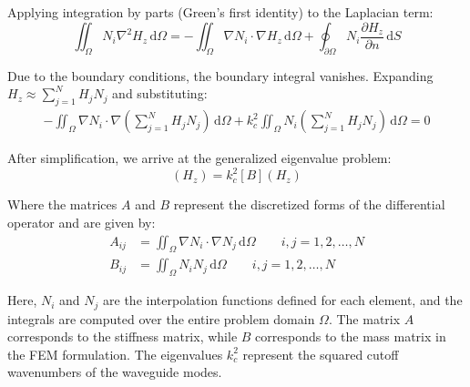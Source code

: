 \documentclass[10pt,letterpaper]{article}
\begin{document}
Applying integration by parts (Green's first identity) to the Laplacian term:
\begin{equation}
\iint_\Omega N_i \nabla^2 H_z \, \mathrm{d}\Omega = -\iint_\Omega \nabla N_i \cdot \nabla H_z \, \mathrm{d}\Omega + \oint_{\partial\Omega} N_i \frac{\partial H_z}{\partial n} \, \mathrm{d}S
\end{equation}

Due to the boundary conditions, the boundary integral vanishes. Expanding $H_z \approx \sum_{j=1}^{N} H_j N_j$ and substituting:
\begin{align}
-\iint_\Omega \nabla N_i \cdot \nabla \left(\sum_{j=1}^{N} H_j N_j\right) \, \mathrm{d}\Omega + k_c^2 \iint_\Omega N_i \left(\sum_{j=1}^{N} H_j N_j\right) \, \mathrm{d}\Omega = 0
\end{align}

After simplification, we arrive at the generalized eigenvalue problem:
\begin{equation}
[A](H_z) = k_c^2 [B](H_z)
\end{equation}

Where the matrices $A$ and $B$ represent the discretized forms of the differential operator and are given by:
\begin{align*}
A_{ij} &= \iint_{\Omega} \nabla N_i \cdot \nabla N_j \, \mathrm{d}\Omega \qquad i,j=1,2,\dots,N \\
B_{ij} &= \iint_{\Omega} N_i N_j \, \mathrm{d}\Omega \qquad i,j=1,2,\dots,N
\end{align*}

Here, $N_i$ and $N_j$ are the interpolation functions defined for each element, 
and the integrals are computed over the entire problem domain $\Omega$. 
The matrix $A$ corresponds to the stiffness matrix, while $B$ corresponds to
 the mass matrix in the FEM formulation. The eigenvalues $k_c^2$ represent the squared cutoff wavenumbers of the waveguide modes.
\end{document}
